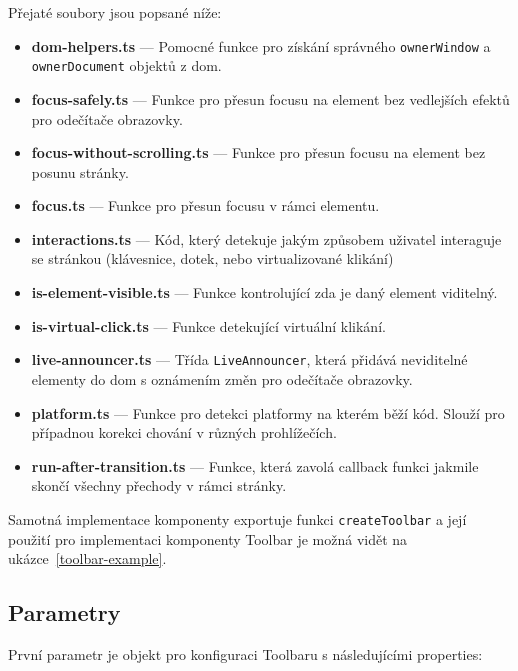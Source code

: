 Přejaté soubory jsou popsané níže:

\begin{itemize}
    \item \textbf{dom-helpers.ts} --- Pomocné funkce pro získání správného \texttt{ownerWindow} a \texttt{ownerDocument} objektů z \gls{dom}.
    \item \textbf{focus-safely.ts} --- Funkce pro přesun focusu na element bez vedlejších efektů pro odečítače obrazovky.
    \item \textbf{focus-without-scrolling.ts} --- Funkce pro přesun focusu na element bez posunu stránky.
    \item \textbf{focus.ts} --- Funkce pro přesun focusu v rámci elementu.
    \item \textbf{interactions.ts} --- Kód, který detekuje jakým způsobem uživatel interaguje se stránkou (klávesnice, dotek, nebo virtualizované klikání)
    \item \textbf{is-element-visible.ts} --- Funkce kontrolující zda je daný element viditelný.
    \item \textbf{is-virtual-click.ts} --- Funkce detekující virtuální klikání.
    \item \textbf{live-announcer.ts} --- Třída \texttt{LiveAnnouncer}, která přidává neviditelné elementy do \gls{dom} s oznámením změn pro odečítače obrazovky.
    \item \textbf{platform.ts} --- Funkce pro detekci platformy na kterém běží kód. Slouží pro případnou korekci chování v různých prohlížečích.
    \item \textbf{run-after-transition.ts} --- Funkce, která zavolá callback funkci jakmile skončí všechny přechody v rámci stránky.
\end{itemize}

Samotná implementace komponenty exportuje funkci \texttt{createToolbar} a její použití pro implementaci komponenty Toolbar je možná vidět na ukázce~\ref{toolbar-example}.

\clearpage

\subsection{Parametry}

První parametr je objekt pro konfiguraci Toolbaru s následujícími properties:

